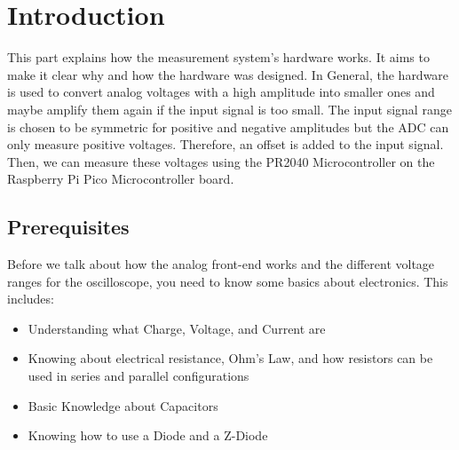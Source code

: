 \section{Introduction}

This part explains how the measurement system's hardware works. It aims to make it clear why and how the hardware was designed. In General, the hardware is used to convert analog voltages with a high amplitude into smaller ones and maybe amplify them again if the input signal is too small. The input signal range is chosen to be symmetric for positive and negative amplitudes but the ADC can only measure positive voltages. Therefore, an offset is added to the input signal. Then, we can measure these voltages using the PR2040 Microcontroller on the Raspberry Pi Pico Microcontroller board.

\subsection{Prerequisites}

Before we talk about how the analog front-end works and the different voltage ranges for the oscilloscope, you need to know some basics about electronics. This includes:

\begin{itemize}
	\item Understanding what Charge, Voltage, and Current are
	\item Knowing about electrical resistance, Ohm's Law, and how resistors can be used in series and parallel configurations
	\item Basic Knowledge about Capacitors
	\item Knowing how to use a Diode and a Z-Diode
\end{itemize}

